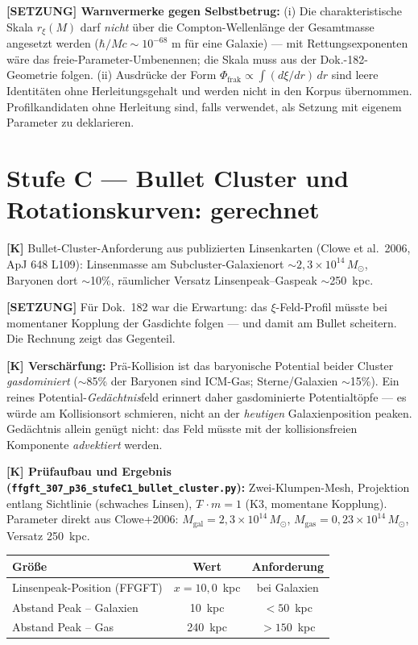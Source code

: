 \documentclass[11pt]{report}
\begin{document}
\medskip
\textbf{[SETZUNG] Warnvermerke gegen Selbstbetrug:}
(i) Die charakteristische Skala $r_\xi(M)$ darf \emph{nicht} über die
Compton-Wellenlänge der Gesamtmasse angesetzt werden
($\hbar/Mc \sim 10^{-68}$ m für eine Galaxie) — mit
Rettungsexponenten wäre das freie-Parameter-Umbenennen; die Skala
muss aus der Dok.-182-Geometrie folgen. (ii) Ausdrücke der Form
$\Phi_{\text{frak}} \propto \int (d\xi/dr)\,dr$ sind leere
Identitäten ohne Herleitungsgehalt und werden nicht in den Korpus
übernommen. Profilkandidaten ohne Herleitung sind, falls verwendet,
als Setzung mit eigenem Parameter zu deklarieren.

\section{Stufe C — Bullet Cluster und Rotationskurven: gerechnet}

\textbf{[K]} Bullet-Cluster-Anforderung aus publizierten Linsenkarten
(Clowe et al.\ 2006, ApJ 648 L109): Linsenmasse am Subcluster-Galaxienort
$\sim 2{,}3\times 10^{14}\,M_\odot$, Baryonen dort $\sim$10\%,
räumlicher Versatz Linsenpeak--Gaspeak $\sim$250~kpc.

\medskip
\textbf{[SETZUNG]} Für Dok.~182 war die Erwartung: das $\xi$-Feld-Profil
müsste bei momentaner Kopplung der Gasdichte folgen — und damit am
Bullet scheitern. Die Rechnung zeigt das Gegenteil.

\medskip
\textbf{[K] Verschärfung:} Prä-Kollision ist das
baryonische Potential beider Cluster \emph{gasdominiert} ($\sim$85\%
der Baryonen sind ICM-Gas; Sterne/Galaxien $\sim$15\%). Ein reines
Potential-\emph{Gedächtnis}feld erinnert daher gasdominierte
Potentialtöpfe — es würde am Kollisionsort schmieren, nicht an der
\emph{heutigen} Galaxienposition peaken. Gedächtnis allein genügt
nicht: das Feld müsste mit der kollisionsfreien Komponente
\emph{advektiert} werden.

\medskip
\textbf{[K] Prüfaufbau und Ergebnis (\texttt{ffgft\_307\_p36\_stufeC1\_bullet\_cluster.py}):}
Zwei-Klumpen-Mesh, Projektion entlang Sichtlinie (schwaches Linsen),
$T\tilde{\,}\cdot m = 1$ (K3, momentane Kopplung). Parameter direkt aus
Clowe+2006: $M_\text{gal} = 2{,}3\times10^{14}\,M_\odot$,
$M_\text{gas} = 0{,}23\times10^{14}\,M_\odot$, Versatz 250~kpc.

\begin{center}
\begin{tabular}{lcc}
\toprule
Größe & Wert & Anforderung \\
\midrule
Linsenpeak-Position (FFGFT) & $x = 10{,}0$~kpc & bei Galaxien \\
Abstand Peak -- Galaxien & 10~kpc & $< 50$~kpc \\
Abstand Peak -- Gas & 240~kpc & $> 150$~kpc \\
\bottomrule
\end{tabular}
\end{center}
\end{document}
